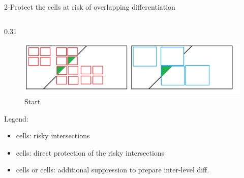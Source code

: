 \documentclass[final,xcolor={dvipsnames,svgnames,table}]{beamer}
\newlength{\colwidth}
\begin{document}
\begin{frame}[fragile,t]
\begin{columns}[t]
\begin{column}{\colwidth}
\begin{block}{2-Protect the cells at risk of overlapping differentiation}
   \begin{columns}
    \begin{column}{0.31\colwidth}
        \vspace{-0.60cm}
        \begin{figure}
            \centering
            \caption{\footnotesize Start}
            \vspace{-1cm}
            \includegraphics[scale=0.35]{Images/test_articulation.png}
        \end{figure}
        \vspace{-0.5cm}
        \footnotesize
        Legend:
        \begin{itemize}
            \item \colorbox{intersection}{cells}: risky intersections
            \item \colorbox{primary}{cells}: direct protection of the risky intersections
            \item \colorbox{second1}{cells} or \colorbox{second2}{cells}: additional suppression to prepare inter-level diff.
        \end{itemize}
    \end{column}

    \hfill


\end{columns}
\end{block}
\end{column}
\end{columns}
\end{frame}
\end{document}
